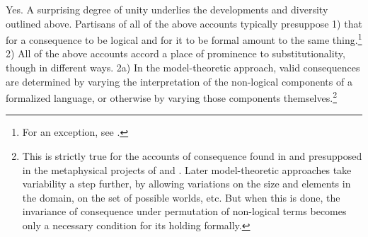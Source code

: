 \documentclass[]{article}
\begin{document}
Yes. A surprising degree of unity underlies the developments and diversity outlined above. Partisans of all of the above accounts typically presuppose 1) that for a consequence to be logical and for it to be formal amount to the same thing.\footnote{For an exception, see \cite{Read1994}.} 2) All of the above accounts accord a place of prominence to substitutionality, though in different ways. 2a) In the model-theoretic approach, valid consequences are determined by varying the interpretation of the non-logical components of a formalized language, or otherwise by varying those components themselves.\footnote{This is strictly true for the accounts of consequence found in \cite{Tarski2002} and presupposed in the metaphysical projects of \cite{Quine1948} and \cite{Lewis1968}. Later model-theoretic approaches take variability a step further, by allowing variations on the size and elements in the domain, on the set of possible worlds, etc. But when this is done, the invariance of consequence under permutation of non-logical terms becomes only a necessary condition for its holding formally.

}
\end{document}
